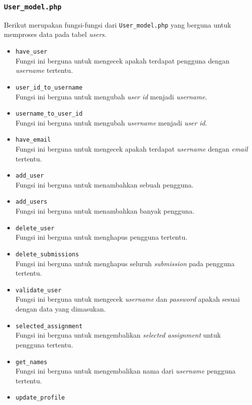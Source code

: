 \subsubsection{\texttt{User\_model.php}}
Berikut merupakan fungsi-fungsi dari \texttt{User\_model.php} yang berguna untuk memproses data pada tabel \textit{users}.
\begin{itemize}
	\item \texttt{have\_user}\\
	Fungsi ini berguna untuk mengecek apakah terdapat pengguna dengan \textit{username} tertentu.
	\item \texttt{user\_id\_to\_username}\\
	Fungsi ini berguna untuk mengubah \textit{user id} menjadi \textit{username}.
	\item \texttt{username\_to\_user\_id}\\
	Fungsi ini berguna untuk mengubah \textit{username} menjadi \textit{user id}.
	\item \texttt{have\_email}\\
	Fungsi ini berguna untuk mengecek apakah terdapat \textit{username} dengan \textit{email} tertentu.
	\item \texttt{add\_user}\\
	Fungsi ini berguna untuk menambahkan sebuah pengguna.
	\item \texttt{add\_users}\\
	Fungsi ini berguna untuk menambahkan banyak pengguna.
	\item \texttt{delete\_user}\\
	Fungsi ini berguna untuk menghapus pengguna tertentu.
	\item \texttt{delete\_submissions}\\
	Fungsi ini berguna untuk menghapus seluruh \textit{submission} pada pengguna tertentu.
	\item \texttt{validate\_user}\\
	Fungsi ini berguna untuk mengecek \textit{username} dan \textit{password} apakah sesuai dengan data yang dimasukan.
	\item \texttt{selected\_assignment}\\
	Fungsi ini berguna untuk mengembalikan \textit{selected assignment} untuk pengguna tertentu.
	\item \texttt{get\_names}\\
	Fungsi ini berguna untuk mengembalikan nama dari \textit{username} pengguna tertentu.
	\item \texttt{update\_profile}\\

\end{itemize}
